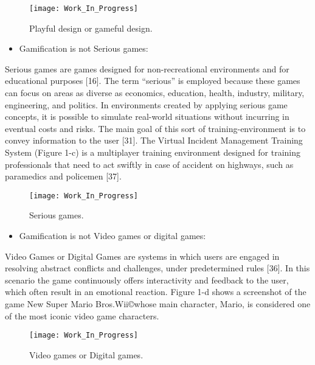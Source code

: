\begin{figure}[h!]
\caption{Playful design or gameful design.}
\centering
\texttt{[image: Work\_In\_Progress]}
\label{fig:work_in_progress}
\end{figure}

\begin{itemize}
\item Gamification is not Serious games:
\end{itemize}

Serious games are games designed for non-recreational
environments and for educational purposes [16]. The term
“serious” is employed because these games can focus on areas as
diverse as economics, education, health, industry, military,
engineering, and politics. In environments created by applying
serious game concepts, it is possible to simulate real-world
situations without incurring in eventual costs and risks. The main
goal of this sort of training-environment is to convey information
to the user [31]. The Virtual Incident Management Training System
(Figure 1-c) is a multiplayer training environment designed for
training professionals that need to act swiftly in case of accident on
highways, such as paramedics and policemen [37].

\begin{figure}[h!]
\caption{Serious games.}
\centering
\texttt{[image: Work\_In\_Progress]}
\label{fig:work_in_progress}
\end{figure}

\begin{itemize}
\item Gamification is not Video games or digital games:
\end{itemize}

Video Games or Digital Games are systems in which users are
engaged in resolving abstract conflicts and challenges, under
predetermined rules [36]. In this scenario the game continuously
offers interactivity and feedback to the user, which often result in
an emotional reaction. Figure 1-d shows a screenshot of the game
New Super Mario Bros.Wii\copyright whose main character, Mario, is
considered one of the most iconic video game characters.

\begin{figure}[h!]
\caption{Video games or Digital games.}
\centering
\texttt{[image: Work\_In\_Progress]}
\label{fig:work_in_progress}
\end{figure}

